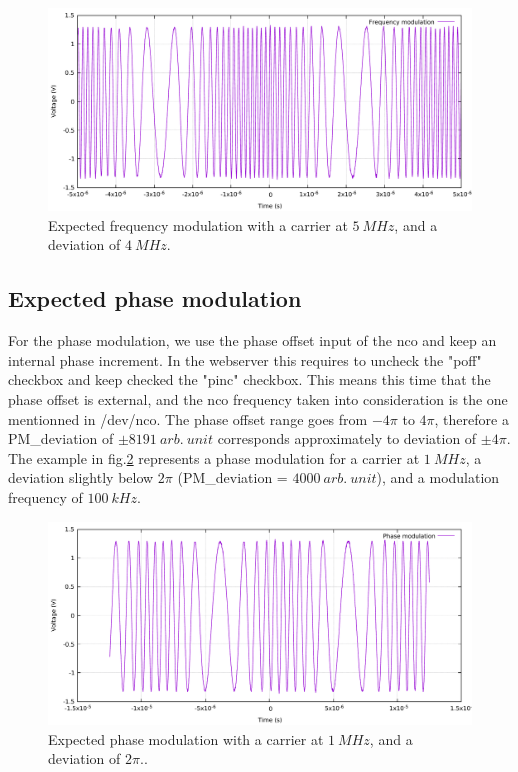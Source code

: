 \documentclass[12pt,oneside]{article}
\begin{document}
\begin{figure}[!h!tb]
	\begin{center}
		\includegraphics[width=12cm]{scope/Mod_freqOk.pdf}
		\caption{Expected frequency modulation with a carrier at $5~MHz$, and a deviation of $4~MHz$.}
		\label{fig:FMModOK}
	\end{center}
\end{figure}
\vspace{0cm}

\subsection{Expected phase modulation}

For the phase modulation, we use the phase offset input of the nco and keep an internal phase increment. In the webserver this requires to uncheck the "poff" checkbox and keep checked the "pinc" checkbox. This means this time that the phase offset is external, and the nco frequency taken into consideration is the one mentionned in /dev/nco. The phase offset range goes from $-4\pi$ to $4\pi$, therefore a PM\_deviation of $\pm 8191~arb.~unit$ corresponds approximately to deviation of $\pm 4 \pi$. 
\newline\newline
The example in fig.\ref{fig:PMModOK} represents a phase modulation for a carrier at $1~MHz$, a deviation slightly below $2\pi$ (PM\_deviation = $4000~arb.~unit$), and a modulation frequency of $100~kHz$.

\begin{figure}[!h!tb]
	\begin{center}
		\includegraphics[width=12cm]{scope/Mod_phaseOk.pdf}
		\caption{Expected phase modulation with a carrier at $1~MHz$, and a deviation of $2 \pi$..}
		\label{fig:PMModOK}
	\end{center}
\end{figure}
\end{document}
